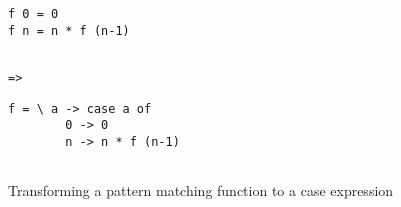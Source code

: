\begin{figure}[ht]
\centering
{}%
\begin{minipage}[t]{0.30\linewidth}
    \centering
    \begin{lstlisting}
f 0 = 0
f n = n * f (n-1)
    \end{lstlisting}
\end{minipage}
\begin{minipage}[t]{0.09\linewidth}
    \centering
    \begin{lstlisting}

=>
    \end{lstlisting}
\end{minipage}
\begin{minipage}[t]{0.30\linewidth}
    \centering
    \begin{lstlisting}
f = \ a -> case a of
        0 -> 0
        n -> n * f (n-1)
      
    \end{lstlisting}
\end{minipage}
\caption{Transforming a pattern matching function to a case expression}
\label{lst:renamer3}
\end{figure}
